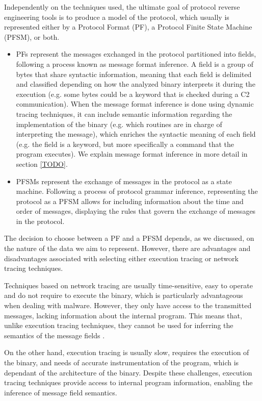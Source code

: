 \documentclass[conference]{IEEEtran}
\begin{document}
Independently on the techniques used, the ultimate goal of protocol reverse
engineering tools is to produce a model of the protocol, which usually is
represented either by a Protocol Format (PF), a Protocol Finite State Machine
(PFSM), or both.
\begin{itemize}
    \item PFs represent the messages exchanged in the protocol partitioned into fields,
          following a process known as message format inference. A field is a group of
          bytes that share syntactic information, meaning that each field is delimited
          and classified depending on how the analyzed binary interprets it during the
          execution \cite{polyglot_caballero} (e.g. some bytes could be a keyword that is
          checked during a C2 communication). When the message format inference is done
          using dynamic tracing techniques, it can include semantic information regarding
          the implementation of the binary (e.g. which routines are in charge of
          interpreting the message), which enriches the syntactic meaning of each field
          (e.g. the field is a keyword, but more specifically a command that the program
          executes). We explain message format inference in more detail in section
          \ref{TODO}.
    \item PFSMs represent the exchange of messages in the protocol as a state machine.
          Following a process of protocol grammar inference, representing the protocol as
          a PFSM allows for including information about the time and order of messages,
          displaying the rules that govern the exchange of messages in the protocol.
\end{itemize}

The decision to choose between a PF and a PFSM depends, as we discussed, on the
nature of the data we aim to represent. However, there are advantages and
disadvantages associated with selecting either execution tracing or network
tracing techniques.

Techniques based on network tracing are usually time-sensitive, easy to operate
and do not require to execute the binary, which is particularly advantageous
when dealing with malware. However, they only have access to the transmitted
messages, lacking information about the internal program. This means that, unlike
execution tracing techniques, they cannot be used for inferring the semantics
of the message fields \cite{apre_survey}.

On the other hand, execution tracing is usually slow, requires the execution of
the binary, and needs of accurate instrumentation of the program, which is
dependant of the architecture of the binary. Despite these challenges,
execution tracing techniques provide access to internal program information,
enabling the inference of message field semantics.
\end{document}
